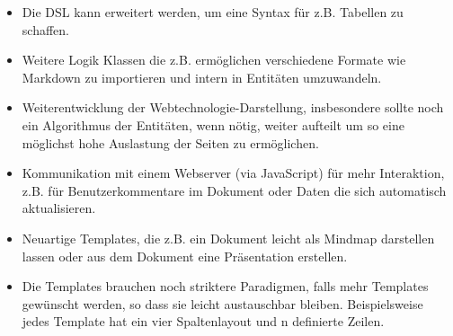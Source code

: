 \begin{itemize}
  \item Die DSL kann erweitert werden,
        um eine Syntax für z.B. Tabellen zu schaffen.
  \item Weitere Logik Klassen die z.B. ermöglichen verschiedene Formate wie
        Markdown zu importieren und intern in Entitäten umzuwandeln.
  \item Weiterentwicklung der Webtechnologie-Darstellung, insbesondere
        sollte noch ein Algorithmus der Entitäten, wenn nötig,
        weiter aufteilt um so eine möglichst hohe Auslastung der Seiten
        zu ermöglichen.
  \item Kommunikation mit einem Webserver (via JavaScript) für mehr Interaktion,
        z.B. für Benutzerkommentare im Dokument oder Daten die sich automatisch
        aktualisieren.
  \item Neuartige Templates, die z.B. ein Dokument leicht als Mindmap
        darstellen lassen oder aus dem Dokument eine Präsentation erstellen.
  \item Die Templates brauchen noch striktere Paradigmen, falls mehr
        Templates gewünscht werden, so dass sie leicht austauschbar bleiben.
        Beispielsweise jedes Template hat ein vier Spaltenlayout und n definierte
        Zeilen.
\end{itemize}